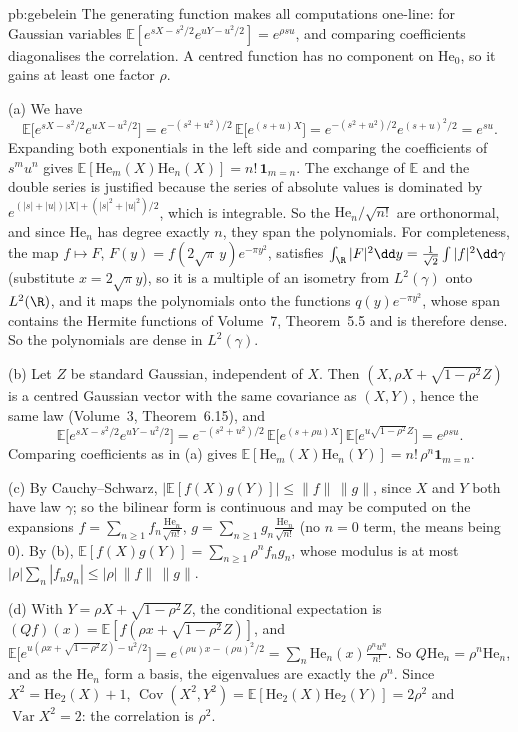 \begin{solution}{pb:gebelein}
\idea The generating function makes all computations one-line: for Gaussian variables $\mathbb E[e^{sX-s^2/2}e^{uY-u^2/2}]=e^{\rho su}$, and comparing coefficients diagonalises the
correlation. A centred function has no component on $\mathrm{He}_0$, so it gains at least one factor $\rho$.

\writeup (a) We have
\[
\mathbb E\bigl[e^{sX-s^2/2}e^{uX-u^2/2}\bigr]=e^{-(s^2+u^2)/2}\,\mathbb E\bigl[e^{(s+u)X}\bigr]=e^{-(s^2+u^2)/2}e^{(s+u)^2/2}=e^{su}.
\]
Expanding both exponentials in the left side and comparing the
coefficients of $s^mu^n$ gives $\mathbb E[\mathrm{He}_m(X)\mathrm{He}_n(X)]=n!\,\mathbf 1_{m=n}$. The exchange of $\mathbb E$ and the double series is justified because the series of absolute
values is dominated by $e^{(|s|+|u|)|X|+(|s|^2+|u|^2)/2}$, which is integrable. So the $\mathrm{He}_n/\sqrt{n!}$ are orthonormal, and since $\mathrm{He}_n$ has degree exactly $n$, they span the
polynomials. For completeness, the map $f\mapsto F$, $F(y)=f(2\sqrt\pi\,y)e^{-\pi y^2}$, satisfies $\int_\R|F|^2\dd y=\frac1{\sqrt2}\int|f|^2\dd\gamma$ (substitute $x=2\sqrt\pi y$), so it is a
multiple of an isometry from $L^2(\gamma)$ onto $L^2(\R)$, and it maps the polynomials onto the functions $q(y)e^{-\pi y^2}$, whose span contains the Hermite functions of Volume~7,
Theorem~5.5 and is therefore dense. So the polynomials are dense in $L^2(\gamma)$.

(b) Let $Z$ be standard Gaussian, independent of $X$. Then $(X,\rho X+\sqrt{1-\rho^2}Z)$ is a centred Gaussian vector with the same covariance as $(X,Y)$, hence the same law (Volume~3,
Theorem~6.15), and
\[
\mathbb E\bigl[e^{sX-s^2/2}e^{uY-u^2/2}\bigr]=e^{-(s^2+u^2)/2}\,\mathbb E\bigl[e^{(s+\rho u)X}\bigr]\,\mathbb E\bigl[e^{u\sqrt{1-\rho^2}Z}\bigr]=e^{\rho su}.
\]
Comparing coefficients as in (a) gives $\mathbb E[\mathrm{He}_m(X)\mathrm{He}_n(Y)]=n!\,\rho^n\mathbf 1_{m=n}$.

(c) By Cauchy--Schwarz, $|\mathbb E[f(X)g(Y)]|\le\|f\|\,\|g\|$, since $X$ and $Y$ both have law $\gamma$; so the bilinear form is continuous and may be computed on the expansions
$f=\sum_{n\ge1}f_n\frac{\mathrm{He}_n}{\sqrt{n!}}$, $g=\sum_{n\ge1}g_n\frac{\mathrm{He}_n}{\sqrt{n!}}$ (no $n=0$ term, the means being $0$). By (b),
$\mathbb E[f(X)g(Y)]=\sum_{n\ge1}\rho^nf_ng_n$, whose modulus is at most $|\rho|\sum_n|f_ng_n|\le|\rho|\,\|f\|\,\|g\|$.

(d) With $Y=\rho X+\sqrt{1-\rho^2}Z$, the conditional expectation is $(Qf)(x)=\mathbb E[f(\rho x+\sqrt{1-\rho^2}Z)]$, and
$\mathbb E\bigl[e^{u(\rho x+\sqrt{1-\rho^2}Z)-u^2/2}\bigr]=e^{(\rho u)x-(\rho u)^2/2}=\sum_n\mathrm{He}_n(x)\frac{\rho^nu^n}{n!}$. So $Q\mathrm{He}_n=\rho^n\mathrm{He}_n$, and as the $\mathrm{He}_n$ form a basis, the
eigenvalues are exactly the $\rho^n$. Since $X^2=\mathrm{He}_2(X)+1$, $\operatorname{Cov}(X^2,Y^2)=\mathbb E[\mathrm{He}_2(X)\mathrm{He}_2(Y)]=2\rho^2$ and $\operatorname{Var}X^2=2$: the correlation is $\rho^2$.


\end{solution}
